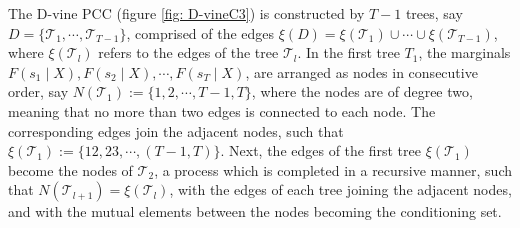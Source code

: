 \documentclass[harvard,11pt]{article}
\begin{document}
The D-vine PCC (figure \ref{fig: D-vineC3}) is constructed by $T-1$ trees, say $D=\{\mathcal{T}_1,\cdots,\mathcal{T}_{T-1}\}$, comprised of the edges $\xi(D)=\xi(\mathcal{T}_1)\cup\cdots\cup \xi(\mathcal{T}_{T-1})$, where $\xi(\mathcal{T}_l)$ refers to the edges of the tree $\mathcal{T}_l$. In the first tree $T_1$, the marginals $F(s_1\mid X),F(s_2\mid X),\cdots,F(s_T\mid X)$, are arranged as nodes in consecutive order, say $N(\mathcal{T}_1):=\{1,2,\cdots,T-1,T\}$, where the nodes are of degree two, meaning that no more than two edges is connected to each node. The corresponding edges join the adjacent nodes, such that $\xi(\mathcal{T}_1):=\{12,23,\cdots,(T-1,T)\}$. Next, the edges of the first tree $\xi(\mathcal{T}_1)$ become the nodes of $\mathcal{T}_2$, a process which is completed in a recursive manner, such that $N(\mathcal{T}_{l+1})=\xi(\mathcal{T}_l)$, with the edges of each tree joining the adjacent nodes, and with the mutual elements between the nodes becoming the conditioning set.  
\end{document}
